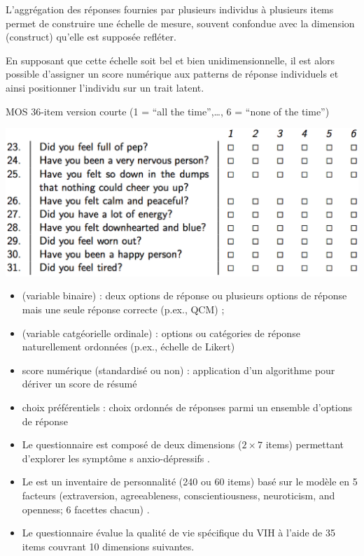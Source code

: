 L'aggrégation des réponses fournies par plusieurs individus à plusieurs items
permet de construire une échelle de mesure, souvent confondue avec la dimension
(construct) qu'elle est supposée refléter.

En supposant que cette échelle soit bel et bien unidimensionnelle, il est alors
possible d'assigner un score numérique aux patterns de réponse individuels et
ainsi positionner l'individu sur un trait latent.


MOS 36-item version courte (1 =
\enquote{all the time},\ldots, 6 = \enquote{none of the time})

{\centering \includegraphics[width=.7\textwidth]{figs/mos_sf36.eps}\par}



\begin{itemize}
\item {} (variable binaire) : deux options de réponse
  ou plusieurs options de réponse mais une seule réponse correcte (p.ex., QCM) ;
\item {} (variable catgéorielle ordinale) : options ou
  catégories de réponse naturellement ordonnées (p.ex., échelle de Likert)
\item score numérique (standardisé ou non) : application d'un algorithme pour
  dériver un score de résumé
\item choix préférentiels : choix ordonnés de réponses parmi un ensemble
  d'options de réponse
\end{itemize}


\begin{itemize}
\item Le questionnaire  est composé de deux dimensions ($2\times
  7$ items) permettant d'explorer les symptôme s
  anxio-dépressifs \autocite{Zigmond1983}.
\item Le  est un inventaire de personnalité (240 ou 60 items)
  basé sur le modèle en 5 facteurs (extraversion, agreeableness,
  conscientiousness, neuroticism, and openness; 6 facettes chacun)
  \autocite{McCrae1992}.
\item Le questionnaire  évalue la qualité de vie spécifique
  du VIH à l'aide de 35 items couvrant 10 dimensions suivantes\autocite{Wu1997a}.
\end{itemize}


